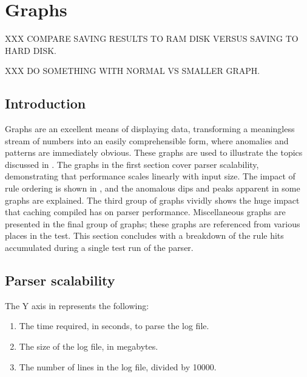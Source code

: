 \section{Graphs}

\label{graphs}

XXX COMPARE SAVING RESULTS TO RAM DISK VERSUS SAVING TO HARD DISK\@.

XXX DO SOMETHING WITH NORMAL VS SMALLER GRAPH\@.


\renewcommand{\figurename}{Graph}

\subsection{Introduction}

Graphs are an excellent means of displaying data, transforming a
meaningless stream of numbers into an easily comprehensible form, where
anomalies and patterns are immediately obvious.  These graphs are used to
illustrate the topics discussed in .  The
graphs in the first section cover parser scalability, demonstrating that
performance scales linearly with input size.  The impact of rule ordering
is shown in , and the anomalous dips and
peaks apparent in some graphs are explained.  The third group of graphs
vividly shows the huge impact that caching compiled \regexes{} has on
parser performance.  Miscellaneous graphs are presented in the final group
of graphs; these graphs are referenced from various places in the test.
This section concludes with a breakdown of the rule hits accumulated during
a single test run of the parser.

\subsection{Parser scalability}


The Y axis in  represents the following:

\begin{enumerate}

    \item The time required, in seconds, to parse the log file.

    \item The size of the log file, in megabytes.

    \item The number of lines in the log file, divided by 10000.

\end{enumerate}

